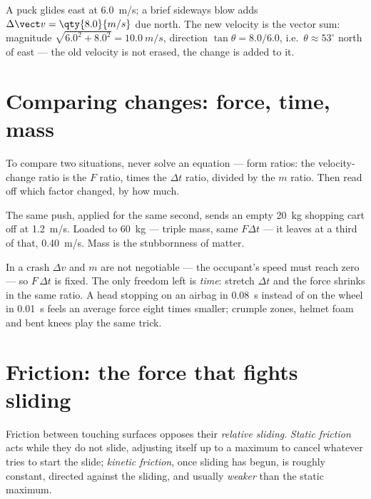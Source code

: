 \begin{example}\label{ex:g11:forces-and-motion:kick}
A puck glides east at \qty{6.0}{m/s}; a brief sideways blow adds
$\Delta\vect v = \qty{8.0}{m/s}$ due north. The new velocity is the
vector sum: magnitude $\sqrt{6.0^2 + 8.0^2} = \qty{10.0}{m/s}$,
direction $\tan\theta = 8.0/6.0$, i.e.\ $\theta \approx 53^\circ$ north
of east --- the old velocity is not erased, the change is added to it.
\end{example}

\section{Comparing changes: force, time, mass}

\begin{method}\label{met:g11:forces-and-motion:ratio}
To compare two situations, never solve an equation --- form ratios: the
velocity-change ratio is the $F$ ratio, times the $\Delta t$ ratio,
divided by the $m$ ratio. Then read off which factor changed, by how much.
\end{method}

\begin{example}\label{ex:g11:forces-and-motion:cart}
The same push, applied for the same second, sends an empty
\qty{20}{kg} shopping cart off at \qty{1.2}{m/s}. Loaded to
\qty{60}{kg} --- triple mass, same $F\Delta t$ --- it leaves at a
third of that, \qty{0.40}{m/s}. Mass is the stubbornness of matter.
\end{example}

\begin{remark}\label{rem:g11:forces-and-motion:airbag}
In a crash $\Delta v$ and $m$ are not negotiable --- the occupant's
speed must reach zero --- so $F\,\Delta t$ is fixed. The only freedom
left is \emph{time}: stretch $\Delta t$ and the force shrinks in the
same ratio. A head stopping on an airbag in \qty{0.08}{s} instead of on
the wheel in \qty{0.01}{s} feels an average force eight times smaller;
crumple zones, helmet foam and bent knees play the same trick.
\end{remark}

\section{Friction: the force that fights sliding}

\begin{definition}\label{def:g11:forces-and-motion:friction}
Friction between touching surfaces opposes their \emph{relative
sliding}. \emph{Static friction} acts while they
do not slide, adjusting itself up to a maximum to cancel whatever tries
to start the slide; \emph{kinetic friction},
once sliding has begun, is roughly constant, directed against the
sliding, and usually \emph{weaker} than the static maximum.
\end{definition}

